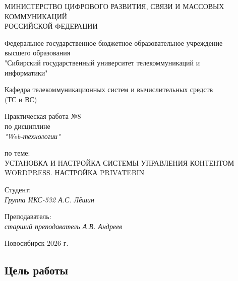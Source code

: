 \documentclass[a4paper,14pt,oneside,openany]{memoir}
\begin{document}
\thispagestyle{empty}

\begin{center}
    МИНИСТЕРСТВО ЦИФРОВОГО РАЗВИТИЯ, СВЯЗИ И МАССОВЫХ \\ КОММУНИКАЦИЙ \\ РОССИЙСКОЙ ФЕДЕРАЦИИ

    \vspace{20pt}

    Федеральное государственное бюджетное образовательное учреждение \\ высшего образования \\
    "Сибирский государственный университет телекоммуникаций и \\ информатики"

    \vspace{20pt}

    Кафедра телекоммуникационных систем и вычислительных средств \\ (ТС и ВС)
\end{center}

\vfill

\begin{center}
    Практическая работа №8 \\
    по дисциплине \\
    \textit{"Web-технологии"}

    \vspace{20pt}

    по теме: \\
    \uppercase{Установка и настройка системы управления контентом WordPress. Настройка PrivateBin}
\end{center}

\vfill

\noindent Студент: \\
\textit{Группа ИКС-532 \hfill А.С. Лёшин}

\vspace{20pt}

\noindent Преподаватель: \\
\textit{старший преподаватель \hfill А.В. Андреев}

\vfill

\begin{center}
    Новосибирск 2026 г.
\end{center}

\newpage
\setcounter{page}{2}
\OnehalfSpacing*

\subsection*{Цель работы}
\end{document}
